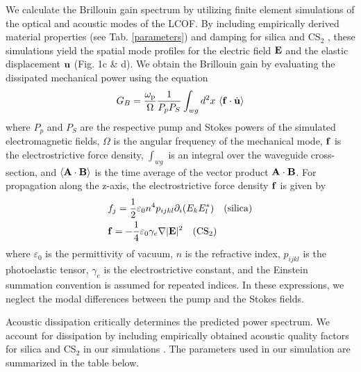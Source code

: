 We calculate the Brillouin gain spectrum by utilizing finite element simulations of the optical and acoustic modes of the LCOF. By including empirically derived material properties (see Tab. \ref{parameters}) and damping for silica \cite{vacher1981ultrasonic} and CS$_2$ \cite{coakley1975brillouin}, these simulations yield the spatial mode profiles for the electric field ${\bf E}$ and the elastic displacement ${\bf u}$ (Fig. 1c \& d). We obtain the Brillouin gain by evaluating the dissipated mechanical power using the equation
\begin{equation}
G_{B} = \frac{\omega_{\rm p}}{\Omega} \frac{1}{P_p P_S} \int_{wg} d^2x \ \langle {\bf f} \cdot \dot{\bf u} \rangle
\end{equation}
where $P_p$ and $P_S$ are the respective pump and Stokes powers of the simulated electromagnetic fields, $\Omega$ is the angular frequency of the mechanical mode, ${\bf f}$ is the electrostrictive force density, $\int_{wg}$ is an integral over the waveguide cross-section, and  $\langle  {\bf A}\cdot {\bf B} \rangle$ is the time average of the vector product ${\bf A}\cdot {\bf B}$. For propagation along the z-axis,  the electrostrictive force density ${\bf f}$ is given by
\begin{align}
\label{ }
& f_j = \frac{1}{2} \varepsilon_0 n^4 p_{ijkl} \partial_i(E_k E_l^*)
\quad {\rm (silica)}
\\
& {\bf f} = - \frac{1}{4} \varepsilon_0 \gamma_e \nabla |{\bf E}|^2 \quad ({\rm CS}_2)
\end{align}
where $\varepsilon_0$ is the permittivity of vacuum, $n$ is the refractive index, $p_{ijkl}$ is the photoelastic tensor, $\gamma_e$ is the electrostrictive constant, and the Einstein summation convention is assumed for repeated indices. In these expressions, we neglect the modal differences between the pump and the Stokes fields.

Acoustic dissipation critically determines the predicted power spectrum. We account for dissipation by including empirically obtained acoustic quality factors for silica and CS$_2$ in our simulations \cite{coakley1975brillouin,vacher1981ultrasonic}. The parameters used in our simulation are summarized in the table below.

